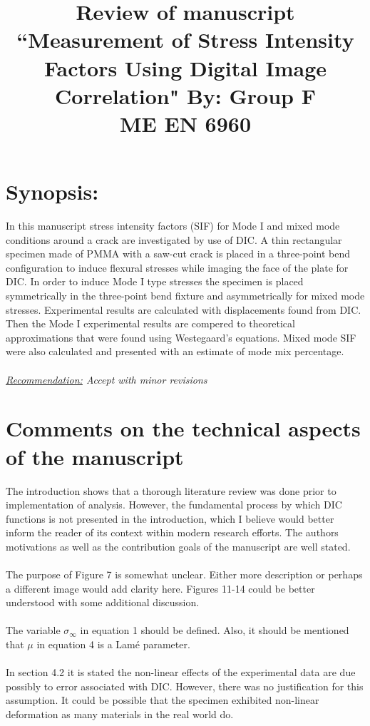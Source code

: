 \documentclass[12pt]{article}
\begin{document}
\title{ Review of manuscript ``Measurement of Stress Intensity Factors Using Digital Image Correlation" By: Group F\\ \normalsize{ME EN 6960}}
\maketitle


\section*{Synopsis:} 
In this manuscript stress intensity factors (SIF) for Mode I and mixed mode conditions around a crack are investigated by use of DIC. A  thin rectangular specimen made of PMMA with a saw-cut crack is placed in a three-point bend configuration to induce flexural stresses while imaging the face of the plate for DIC. In order to induce Mode I type stresses the specimen is placed symmetrically in the three-point bend fixture and asymmetrically for mixed mode stresses.  Experimental results are calculated with displacements found from DIC. Then the Mode I experimental results are compered to theoretical approximations that were found using Westegaard's equations. Mixed mode SIF were  also calculated and presented with an estimate of mode mix percentage.
\\ 
\\
\textit{\underline{Recommendation:} Accept with minor revisions}

\section*{Comments on the technical aspects of the manuscript}
The introduction shows that a thorough literature review was done prior to implementation of analysis. However, the fundamental process by which  DIC functions is not presented in the introduction, which I believe would better inform the reader of its context within modern research efforts. The authors motivations as well as the contribution goals of the manuscript are well stated. 
 \\
 \\
 The purpose of Figure 7 is somewhat unclear. Either more description or perhaps a different image would add clarity here. Figures 11-14 could be better understood with some additional discussion. 
 \\
 \\
 The variable $\sigma_\infty$ in equation 1 should be defined.  Also, it should be mentioned that $\mu$  in equation 4 is a Lam\'e  parameter. 
 \\
 \\
 In section 4.2 it is stated the non-linear effects of the experimental data are due possibly to error associated with DIC. However, there was no justification for this assumption.  It could be possible that the specimen exhibited non-linear deformation as many materials in the real world do. 
\end{document}
